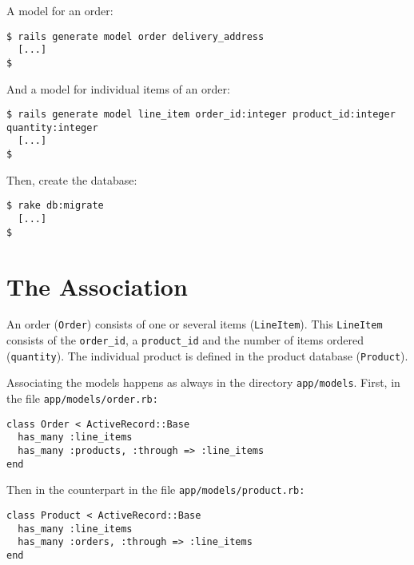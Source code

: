 \documentclass[a4paper]{book}
\newcounter{tab}[chapter]
\begin{document}
A model for an order:

\begin{shaded}\begin{verbatim}
$ rails generate model order delivery_address
  [...]
$
\end{verbatim}\end{shaded}

And a model for individual items of an order:

\begin{shaded}\begin{verbatim}
$ rails generate model line_item order_id:integer product_id:integer quantity:integer
  [...]
$
\end{verbatim}\end{shaded}

Then, create the database:

\begin{shaded}\begin{verbatim}
$ rake db:migrate
  [...]
$
\end{verbatim}\end{shaded}

\section{The Association}\label{the-association}

An order (\texttt{Order}) consists of one or several items (\texttt{LineItem}). This \texttt{LineItem} consists of the \texttt{order\_id}, a \texttt{product\_id} and the number of items ordered (\texttt{quantity}). The individual product is defined in the product database (\texttt{Product}).

Associating the models happens as always in the directory \texttt{app/models}. First, in the file \texttt{app/models/order.rb:}

\begin{shaded}\begin{verbatim}
class Order < ActiveRecord::Base
  has_many :line_items
  has_many :products, :through => :line_items
end
\end{verbatim}\end{shaded}

Then in the counterpart in the file \texttt{app/models/product.rb:}

\begin{shaded}\begin{verbatim}
class Product < ActiveRecord::Base
  has_many :line_items
  has_many :orders, :through => :line_items
end
\end{verbatim}\end{shaded}
\end{document}
